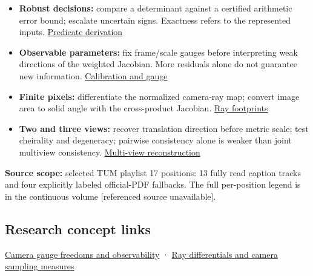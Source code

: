 \begin{itemize}
\tightlist
\item
  \textbf{Robust decisions:} compare a determinant against a certified arithmetic error bound; escalate uncertain signs. Exactness refers to the represented inputs. \hyperref[02-foundations-ii-ch034-a-sign-can-matter-more-than-a-coordinate-robust-predicates]{Predicate derivation}
\item
  \textbf{Observable parameters:} fix frame/scale gauges before interpreting weak directions of the weighted Jacobian. More residuals alone do not guarantee new information. \hyperref[02-foundations-ii-ch036-calibration-needs-informative-observations-and-a-fixed-gauge]{Calibration and gauge}
\item
  \textbf{Finite pixels:} differentiate the normalized camera-ray map; convert image area to solid angle with the cross-product Jacobian. \hyperref[02-foundations-ii-ch036-a-camera-ray-carries-a-pixel-footprint]{Ray footprints}
\item
  \textbf{Two and three views:} recover translation direction before metric scale; test cheirality and degeneracy; pairwise consistency alone is weaker than joint multiview consistency. \hyperref[02-foundations-ii-ch036-calibrated-two-view-geometry-direction-before-distance]{Multi-view reconstruction}
\end{itemize}

\textbf{Source scope:} selected TUM playlist 17 positions: 13 fully read caption tracks and four explicitly labeled official-PDF fallbacks. The full per-position legend is in {the continuous volume {[}referenced source unavailable{]}}.

\subsection{Research concept links}\label{appendix-a2b71a18f5a2-research-concept-links}

\hyperref[appendix-113f0267e5f4]{Camera gauge freedoms and observability} · \hyperref[appendix-8c40fad29462]{Ray differentials and camera sampling measures}
